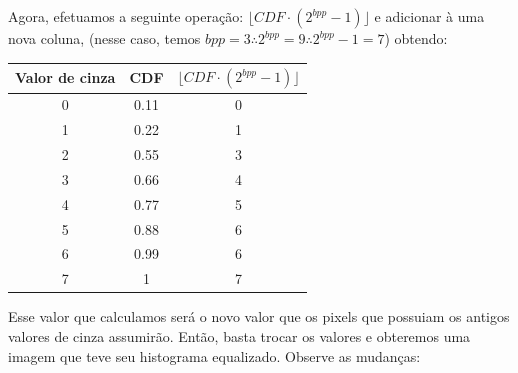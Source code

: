 \documentclass[a4paper, 12pt]{article}
\begin{document}
Agora, efetuamos a seguinte operação: $\lfloor CDF \cdot (2^{bpp} - 1) \rfloor$ e adicionar à uma nova coluna, (nesse caso, temos 
$bpp = 3 \therefore 2^{bpp} = 9 \therefore 2^{bpp} - 1 = 7$) obtendo:

\begin{table}[!htbp]
	\centering
	\begin{tabular}{|c|c|c|}
	\hline
	Valor de cinza & CDF  & $\lfloor CDF \cdot (2^{bpp} - 1) \rfloor$ \\ \hline
	0              & 0.11 & 0                                     \\ \hline
	1              & 0.22 & 1                                     \\ \hline
	2              & 0.55 & 3                                     \\ \hline
	3              & 0.66 & 4                                     \\ \hline
	4              & 0.77 & 5                                     \\ \hline
	5              & 0.88 & 6                                     \\ \hline
	6              & 0.99 & 6                                     \\ \hline
	7              & 1    & 7                                     \\ \hline
	\end{tabular}
\end{table}

Esse valor que calculamos será o novo valor que os pixels que possuiam os antigos valores de cinza assumirão. Então, basta trocar os valores e obteremos 
uma imagem que teve seu histograma equalizado. Observe as mudanças:
\\
\end{document}
